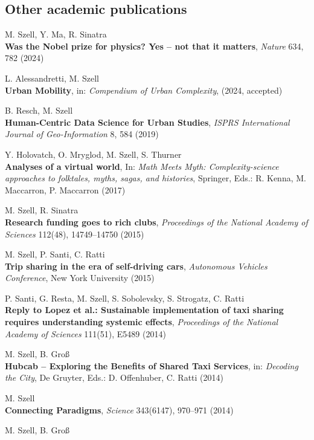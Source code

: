 \documentclass[10pt,a4paper]{article}
\renewenvironment{itemize}{
  \begin{list}{}{
    \setlength{\leftmargin}{1.5em}
    \setlength{\itemsep}{0.25em}
    \setlength{\parskip}{0pt}
    \setlength{\parsep}{0.25em}
  }
}{
  \end{list}
}
\begin{document}
\subsection*{Other academic publications}
\begin{itemize}
\setlength\itemsep{1em}
\item M. Szell, Y. Ma, R. Sinatra\\
    \textbf{Was the Nobel prize for physics? Yes -- not that it matters}, \textit{Nature} 634, 782 (2024)
\item L. Alessandretti, M. Szell\\
    \textbf{Urban Mobility}, in: \textit{Compendium of Urban Complexity}, (2024, accepted)
    \item B. Resch, M. Szell\\
    \textbf{Human-Centric Data Science for Urban Studies}, \textit{ISPRS International Journal of Geo-Information}  8, 584 (2019)
\item Y. Holovatch, O. Mryglod, M. Szell, S. Thurner\\
    \textbf{Analyses of a virtual world}, In: \textit{Math Meets Myth: Complexity-science approaches to folktales, myths, sagas, and histories}, Springer, Eds.: R. Kenna, M. Maccarron, P. Maccarron (2017)
\item M. Szell, R. Sinatra\\
    \textbf{Research funding goes to rich clubs}, \textit{Proceedings of the National Academy of Sciences} 112(48), 14749--14750 (2015)    
\item M. Szell, P. Santi, C. Ratti\\
\textbf{Trip sharing in the era of self-driving cars}, \textit{Autonomous Vehicles Conference}, New York University (2015)
\item P. Santi, G. Resta, M. Szell, S. Sobolevsky, S. Strogatz, C. Ratti\\
    \textbf{Reply to Lopez et al.: Sustainable implementation of taxi sharing requires understanding systemic effects}, \textit{Proceedings of the National Academy of Sciences} 111(51), E5489 (2014)
\item M. Szell, B. Gro{\ss}\\
    \textbf{Hubcab -- Exploring the Benefits of Shared Taxi Services}, in: \textit{Decoding the City}, De Gruyter, Eds.: D. Offenhuber, C. Ratti (2014)
\item M. Szell\\
    \textbf{Connecting Paradigms}, \textit{Science} 343(6147), 970--971 (2014)
\item M. Szell, B. Gro{\ss}\\

\end{itemize}
\end{document}
